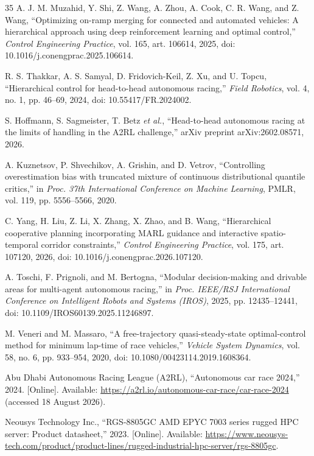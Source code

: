 \documentclass[final,5p,twocolumn]{elsarticle}
\begin{document}
\begin{thebibliography}{35}
A. J. M. Muzahid, Y. Shi, Z. Wang, A. Zhou, A. Cook, C. R. Wang, and Z. Wang,
``Optimizing on-ramp merging for connected and automated vehicles: A
hierarchical approach using deep reinforcement learning and optimal control,''
\emph{Control Engineering Practice}, vol. 165, art. 106614, 2025,
doi: 10.1016/j.conengprac.2025.106614.

R. S. Thakkar, A. S. Samyal, D. Fridovich-Keil, Z. Xu, and U. Topcu,
``Hierarchical control for head-to-head autonomous racing,''
\emph{Field Robotics}, vol. 4, no. 1, pp. 46--69, 2024,
doi: 10.55417/FR.2024002.

S. Hoffmann, S. Sagmeister, T. Betz \emph{et al.},
``Head-to-head autonomous racing at the limits of handling in the A2RL
challenge,'' arXiv preprint arXiv:2602.08571, 2026.

A. Kuznetsov, P. Shvechikov, A. Grishin, and D. Vetrov,
``Controlling overestimation bias with truncated mixture of continuous
distributional quantile critics,'' in \emph{Proc. 37th International
Conference on Machine Learning}, PMLR, vol. 119, pp. 5556--5566, 2020.

C. Yang, H. Liu, Z. Li, X. Zhang, X. Zhao, and B. Wang,
``Hierarchical cooperative planning incorporating MARL guidance and
interactive spatio-temporal corridor constraints,''
\emph{Control Engineering Practice}, vol. 175, art. 107120, 2026,
doi: 10.1016/j.conengprac.2026.107120.

A. Toschi, F. Prignoli, and M. Bertogna,
``Modular decision-making and drivable areas for multi-agent autonomous
racing,'' in \emph{Proc. IEEE/RSJ International Conference on Intelligent
Robots and Systems (IROS)}, 2025, pp. 12435--12441,
doi: 10.1109/IROS60139.2025.11246897.

M. Veneri and M. Massaro,
``A free-trajectory quasi-steady-state optimal-control method for minimum
lap-time of race vehicles,''
\emph{Vehicle System Dynamics}, vol. 58, no. 6, pp. 933--954, 2020,
doi: 10.1080/00423114.2019.1608364.

Abu Dhabi Autonomous Racing League (A2RL),
``Autonomous car race 2024,'' 2024. [Online]. Available:
\url{https://a2rl.io/autonomous-car-race/car-race-2024}
(accessed 18 August 2026).

Neousys Technology Inc., ``RGS-8805GC AMD EPYC 7003 series rugged HPC server:
Product datasheet,'' 2023. [Online]. Available:
\url{https://www.neousys-tech.com/product/product-lines/rugged-industrial-hpc-server/rgs-8805gc}.

\end{thebibliography}
\end{document}
